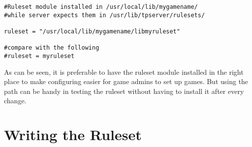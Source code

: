 \documentclass[a4paper,11pt]{report}
\begin{document}
\begin{verbatim}
#Ruleset module installed in /usr/local/lib/mygamename/
#while server expects them in /usr/lib/tpserver/rulesets/

ruleset = "/usr/local/lib/mygamename/libmyruleset"

#compare with the following
#ruleset = myruleset
\end{verbatim}

As can be seen, it is preferable to have the ruleset module installed in the right place to make configuring easier for game admins to set up games. But using the path can be handy in testing the ruleset without having to install it after every change.

\chapter{Writing the Ruleset}
\label{chap:ruleset-writing}
\end{document}
